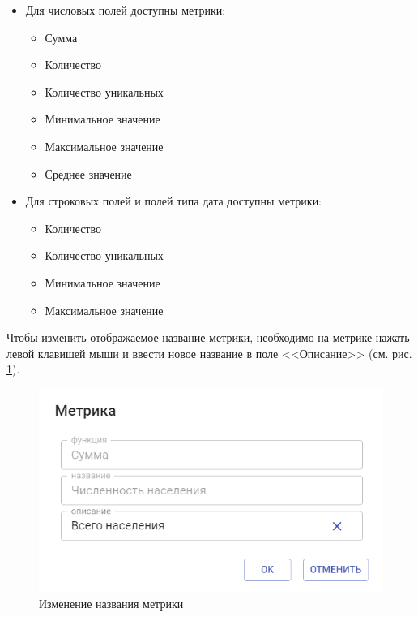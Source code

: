 \documentclass[../user-manual.tex]{subfiles}
\begin{document}
	\begin{itemize}
		
		\item Для числовых полей доступны метрики:
			\begin{itemize}
				
				\item Сумма
				
				\item Количество
				
				\item Количество уникальных
				
				\item Минимальное значение
				
				\item Максимальное значение
				
				\item Среднее значение
			\end{itemize}
	
		\item Для строковых полей и полей типа дата доступны метрики:
			\begin{itemize}
			
				\item Количество
				
				\item Количество уникальных
			
				\item Минимальное значение
			
				\item Максимальное значение
			\end{itemize}
	
	\end{itemize}

	Чтобы изменить отображаемое название метрики, необходимо на метрике нажать левой клавишей мыши и ввести новое название в поле <<Описание>> (см. рис. \ref{fig:change-name}).
	
	\begin{figure}[h]
		\centering
		\includegraphics[width=\graphicswidth]{img/7-change-metrics-name.png}
		\caption{Изменение названия метрики}
		\label{fig:change-name}
	\end{figure}
	
\end{document}
